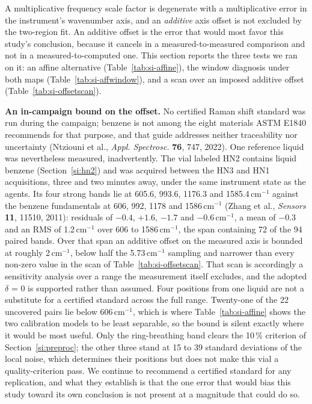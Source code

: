 \documentclass[11pt]{article}
\newcommand*\wn{\ensuremath{\text{cm}^{-1}}}
\begin{document}
A multiplicative frequency scale factor is degenerate with a multiplicative error in the
instrument's wavenumber axis, and an \emph{additive} axis offset is not excluded by the
two-region fit. An additive offset is the error that would most favor this study's
conclusion, because it cancels in a measured-to-measured comparison and not in a
measured-to-computed one. This section reports the three tests we ran on it: an affine alternative (Table~\ref{tab:si-affine}), the window diagnosis under both maps (Table~\ref{tab:si-affwindow}), and a scan over an imposed additive offset (Table~\ref{tab:si-offsetscan}).

\textbf{An in-campaign bound on the offset.} No certified Raman shift standard was run
during the campaign; benzene is not among the eight materials ASTM E1840 recommends for
that purpose, and that guide addresses neither traceability nor uncertainty (Ntziouni
et al., \textit{Appl. Spectrosc.} \textbf{76}, 747, 2022). One reference liquid was
nevertheless measured,
inadvertently. The vial labeled HN2 contains liquid benzene
(Section~\ref{si:hn2}) and was acquired between the HN3 and HN1 acquisitions, three and
two minutes away, under the same instrument state as the agents. Its four strong bands lie
at 605.6, 993.6, 1176.3 and 1585.4\,\wn{} against the benzene fundamentals at 606, 992,
1178 and 1586\,\wn{} (Zhang et al., \textit{Sensors} \textbf{11}, 11510, 2011): residuals
of $-0.4$, $+1.6$, $-1.7$ and
$-0.6$\,\wn{}, a mean of $-0.3$ and an RMS of 1.2\,\wn{} over 606 to 1586\,\wn{}, the span
containing 72 of the 94 paired bands. Over that span an additive
offset on the measured axis is bounded at roughly 2\,\wn{}, below half the
5.73\,\wn{} sampling and narrower than every non-zero value in the scan of
Table~\ref{tab:si-offsetscan}. That scan is accordingly a sensitivity analysis over a
range the measurement itself excludes, and the adopted $\delta$ = 0 is supported rather
than assumed. Four positions from one liquid are not a substitute for a certified standard
across the full range. Twenty-one of the 22 uncovered pairs lie below 606\,\wn{}, which is
where Table~\ref{tab:si-affine} shows the two calibration models to be least separable, so
the bound is silent exactly where it would be most useful. Only the ring-breathing band
clears the 10\,\% criterion of Section~\ref{si:preproc}; the other three stand at 15 to 39
standard deviations of the local noise, which determines their positions but does not make
this vial a quality-criterion pass. We continue to recommend a certified standard for any
replication, and what they
establish is that the one error that would bias this study toward its own conclusion is
not present at a magnitude that could do so.
\end{document}
